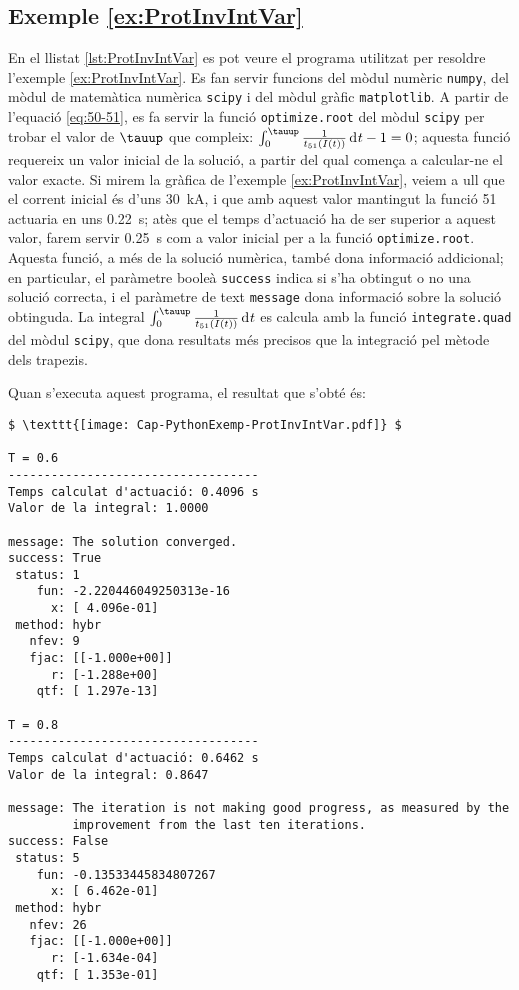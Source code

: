 \hypertarget{exemple:ProtInvIntVar}{\subsection{Exemple \ref*{ex:ProtInvIntVar} \ProtInvIntVar}}
En el llistat \vref{lst:ProtInvIntVar} es pot veure el programa utilitzat per resoldre l'exemple \vref{ex:ProtInvIntVar}. Es fan servir funcions  del mòdul numèric \texttt{numpy}, del mòdul de matemàtica numèrica \texttt{scipy} i del mòdul gràfic \texttt{matplotlib}. A partir de l'equació \eqref{eq:50-51}, es fa servir la funció  \texttt{optimize.root} del mòdul \texttt{scipy} per trobar el valor de $\tauup$ que compleix: $\int_0^\tauup \frac{1}{t_{51}(I(t))}  \diff t - 1 = 0$; aquesta  funció requereix un valor inicial de la solució, a partir del qual comença a calcular-ne el valor exacte. Si mirem la gràfica de l'exemple \ref{ex:ProtInvIntVar}, veiem a ull que el corrent inicial és d'uns \qty{30}{kA}, i que amb aquest valor mantingut la funció 51 actuaria en uns \qty{0,22}{s}; atès que el temps d'actuació ha de ser superior a aquest valor, farem servir \qty{0,25}{s} com a valor inicial per a la funció \texttt{optimize.root}. Aquesta funció, a més de la solució numèrica, també  dona informació addicional; en particular, el paràmetre booleà \texttt{success} indica si s'ha obtingut o no una solució correcta, i el  paràmetre de text \texttt{message}  dona informació sobre la solució obtinguda. La integral $\int_0^\tauup \frac{1}{t_{51}(I(t))}  \diff t$ es calcula amb la funció \texttt{integrate.quad} del mòdul \texttt{scipy}, que dona resultats més precisos que la integració pel mètode dels trapezis.


Quan s'executa aquest programa, el resultat que s'obté és:
\lstset{
	language=,
	numbers=none,
	frame=none
}
\begin{lstlisting}[mathescape=true]
$ \texttt{[image: Cap-PythonExemp-ProtInvIntVar.pdf]} $

T = 0.6
-----------------------------------
Temps calculat d'actuació: 0.4096 s
Valor de la integral: 1.0000

message: The solution converged.
success: True
 status: 1
    fun: -2.220446049250313e-16
      x: [ 4.096e-01]
 method: hybr
   nfev: 9
   fjac: [[-1.000e+00]]
      r: [-1.288e+00]
    qtf: [ 1.297e-13]

T = 0.8
-----------------------------------
Temps calculat d'actuació: 0.6462 s
Valor de la integral: 0.8647

message: The iteration is not making good progress, as measured by the 
         improvement from the last ten iterations.
success: False
 status: 5
    fun: -0.13533445834807267
      x: [ 6.462e-01]
 method: hybr
   nfev: 26
   fjac: [[-1.000e+00]]
      r: [-1.634e-04]
    qtf: [ 1.353e-01]
\end{lstlisting}


